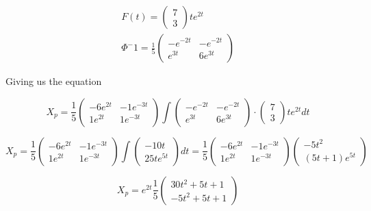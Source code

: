 \documentclass[a4paper]{article}
\begin{document}
\begin{align}
    F(t) = 
    \begin{pmatrix}
        7 \\
        3
    \end{pmatrix}
    te^{2t}\\
    \Phi^-1 = \frac{1}{5} \begin{pmatrix}
        -e^{-2t} & -e^{-2t} \\
        e^{3t} & 6e^{3t}
    \end{pmatrix}
\end{align}

Giving us the equation

\begin{equation}
    X_p = \frac{1}{5} \begin{pmatrix}
    -6e^{2t} & -1e^{-3t} \\
    1e^{2t} & 1e^{-3t}
\end{pmatrix}  \int \begin{pmatrix}
    -e^{-2t} & -e^{-2t} \\
    e^{3t} & 6e^{3t}
\end{pmatrix} \cdot \begin{pmatrix}
    7 \\
    3
\end{pmatrix}
te^{2t} dt
\end{equation}

\begin{equation}
    X_p = \frac{1}{5} \begin{pmatrix}
        -6e^{2t} & -1e^{-3t} \\
        1e^{2t} & 1e^{-3t}
    \end{pmatrix} \int \begin{pmatrix}
        -10t \\
        25te^{5t}
    \end{pmatrix} dt = \frac{1}{5} \begin{pmatrix}
        -6e^{2t} & -1e^{-3t} \\
        1e^{2t} & 1e^{-3t}
    \end{pmatrix} \begin{pmatrix}
        -5t^2 \\
        (5t+1)e^{5t}
    \end{pmatrix}
\end{equation}

\begin{equation}
    X_p = e^{2t} \frac{1}{5} \begin{pmatrix}
        30t^2 + 5t+1 \\
        -5t^2 + 5t+1
    \end{pmatrix}
\end{equation}
\end{document}
